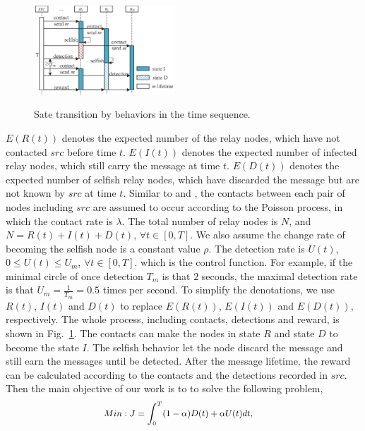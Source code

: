 \begin{figure}
  \centering
  {\includegraphics[width=0.47\textwidth]{fig/schedule.eps}}
     \caption{Sate transition by behaviors in the time sequence.}
     \label{fig:schedule}
\end{figure}
$E(R(t))$ denotes the expected number of the relay nodes,
which have not contacted $src$ before time $t$.
$E(I(t))$ denotes the expected number of infected relay nodes,
which still carry the message at time $t$.
$E(D(t))$ denotes the expected number of selfish relay nodes,
which have discarded the message but are not known by $src$
at time $t$.
Similar to \cite{DBLP:journals/tcss/WuDH18} and \cite{CC2007PerfAnaly},
the contacts between each pair of nodes including $src$
are assumed to occur according to the Poisson process,
in which the contact rate is $\lambda$.
The total number of relay nodes is $N$,
and $N=R(t)+I(t)+D(t)$, $\forall t \in [0, T]$.
We also assume the change rate of
becoming the selfish node is a constant value $\rho$.
The detection rate is $U(t)$,
$0 \le U(t) \le U_{m}$, $\forall t \in [0, T]$.
which is the control function.
For example, if the minimal circle
of once detection $T_{m}$ is that $2$ seconds,
the maximal detection rate is
that $U_{m} = \frac{1}{T_{m}} = 0.5$ times per second.
To simplify the denotations,
we use $R(t)$, $I(t)$ and $D(t)$ to
replace $E(R(t))$, $E(I(t))$ and $E(D(t))$,
respectively.
The whole process,
including contacts, detections and reward,
is shown in Fig.~\ref{fig:schedule}.
The contacts can make the nodes in state $R$ and state $D$
to become the state $I$.
The selfish behavior let the node discard the message
and still earn the messages until be detected.
After the message lifetime,
the reward can be calculated according to
the contacts and the detections recorded in $src$.
Then the main objective of our work is to
to solve the following problem,
\begin{equation}
\begin{small}
\label{eq:obj}
\begin{aligned}
Min: J &= \int_{0}^{T} (1-\alpha) D(t) + \alpha U(t) dt,
\end{aligned}
\end{small}
\end{equation}
